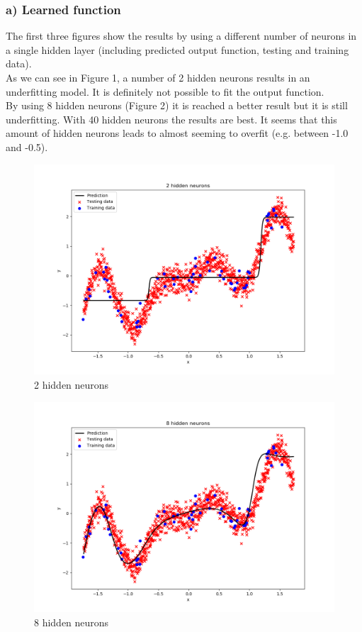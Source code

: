 \subsubsection*{a) Learned function}
The first three figures show the results by using a different number of neurons in a single hidden layer (including predicted output function, testing and training data).\\
As we can see in Figure 1, a number of 2 hidden neurons results in an underfitting model. It is definitely not possible to fit the output function.\\
By using 8 hidden neurons (Figure 2) it is reached a better result but it is still underfitting. With 40 hidden neurons the results are best. It seems that this amount of hidden neurons leads to almost seeming to overfit (e.g. between -1.0 and -0.5).

\begin{figure}[!htbp]
	\centering
        \includegraphics[width=12cm]{1_1_a_2}
	\caption{2 hidden neurons}
\end{figure}

\begin{figure}[!htbp]
	\centering
        \includegraphics[width=12cm]{1_1_a_8}
	\caption{8 hidden neurons}
\end{figure}

